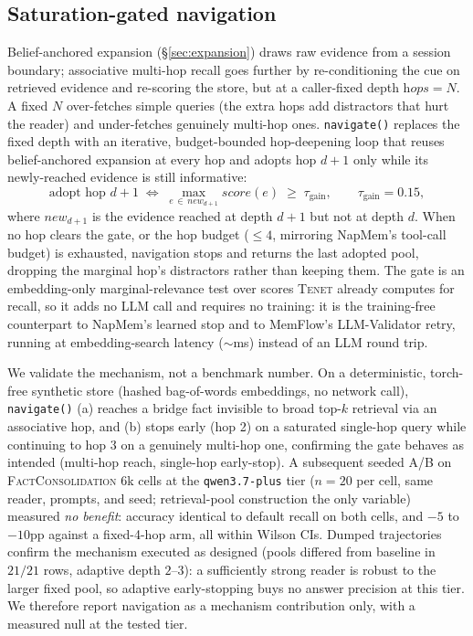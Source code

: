 \documentclass[11pt]{article}
\newcommand{\tenet}{\textsc{Tenet}}
\begin{document}
\subsection{Saturation-gated navigation}\label{sec:navigate}
Belief-anchored expansion (\S\ref{sec:expansion}) draws raw evidence from a session
boundary; associative multi-hop recall goes further by re-conditioning the cue on
retrieved evidence and re-scoring the store, but at a caller-fixed depth
$\textit{hops}=N$. A fixed $N$ over-fetches simple queries (the extra hops add
distractors that hurt the reader) and under-fetches genuinely multi-hop ones.
\texttt{navigate()} replaces the fixed depth with an iterative, budget-bounded
hop-deepening loop that reuses belief-anchored expansion at every hop and adopts hop
$d{+}1$ only while its newly-reached evidence is still informative:
\begin{equation}
\text{adopt hop } d{+}1 \;\Longleftrightarrow\;
\max_{e\,\in\,\textit{new}_{d+1}} \textit{score}(e) \;\ge\; \tau_{\text{gain}},
\qquad \tau_{\text{gain}} = 0.15,
\end{equation}
where $\textit{new}_{d+1}$ is the evidence reached at depth $d{+}1$ but not at depth
$d$. When no hop clears the gate, or the hop budget ($\le 4$, mirroring NapMem's
tool-call budget) is exhausted, navigation stops and returns the last adopted pool,
dropping the marginal hop's distractors rather than keeping them. The gate is an
embedding-only marginal-relevance test over scores \tenet{} already computes for
recall, so it adds no LLM call and requires no training: it is the training-free
counterpart to NapMem's learned stop and to MemFlow's LLM-Validator retry, running at
embedding-search latency ($\sim$ms) instead of an LLM round trip.

We validate the mechanism, not a benchmark number. On a deterministic, torch-free
synthetic store (hashed bag-of-words embeddings, no network call), \texttt{navigate()}
(a) reaches a bridge fact invisible to broad top-$k$ retrieval via an associative hop,
and (b) stops early (hop 2) on a saturated single-hop query while continuing to hop 3
on a genuinely multi-hop one, confirming the gate behaves as intended (multi-hop reach,
single-hop early-stop). A subsequent seeded A/B on \textsc{FactConsolidation} 6k cells
at the \texttt{qwen3.7-plus} tier ($n{=}20$ per cell, same reader, prompts, and seed;
retrieval-pool construction the only variable) measured \emph{no benefit}: accuracy
identical to default recall on both cells, and $-5$ to $-10$pp against a fixed-4-hop
arm, all within Wilson CIs. Dumped trajectories confirm the mechanism executed as
designed (pools differed from baseline in $21/21$ rows, adaptive depth $2$--$3$): a
sufficiently strong reader is robust to the larger fixed pool, so adaptive
early-stopping buys no answer precision at this tier. We therefore report navigation
as a mechanism contribution only, with a measured null at the tested tier.
\end{document}
